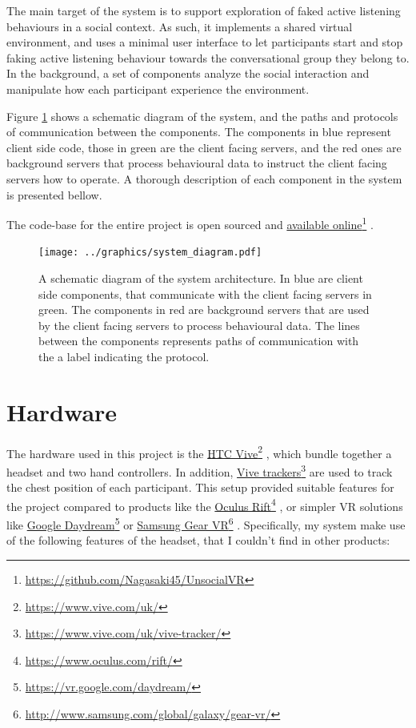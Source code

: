 \documentclass[]{simple-thesis}
\newcommand\fnurl[2]{%
  \href{#2}{#1}\footnote{\url{#2}}%
}
\begin{document}
The main target of the system is to support exploration of faked active listening behaviours in a social context.
As such, it implements a shared virtual environment, and uses a minimal user interface to let participants start and stop faking active listening behaviour towards the conversational group they belong to.
In the background, a set of components analyze the social interaction and manipulate how each participant experience the environment.

Figure \ref{fig:system:diagram} shows a schematic diagram of the system, and the paths and protocols of communication between the components.
The components in blue represent client side code, those in green are the client facing servers, and the red ones are background servers that process behavioural data to instruct the client facing servers how to operate.
A thorough description of each component in the system is presented bellow.

The code-base for the entire project is open sourced and \fnurl{available online}{https://github.com/Nagasaki45/UnsocialVR}.

\begin{figure}
  \texttt{[image: ../graphics/system\_diagram.pdf]}
  \caption{A schematic diagram of the system architecture. In blue are client side components, that communicate with the client facing servers in green. The components in red are background servers that are used by the client facing servers to process behavioural data. The lines between the components represents paths of communication with the a label indicating the protocol.}
  \label{fig:system:diagram}
\end{figure}

\section{Hardware}

The hardware used in this project is the \fnurl{HTC Vive}{https://www.vive.com/uk/}, which bundle together a headset and two hand controllers.
In addition, \fnurl{Vive trackers}{https://www.vive.com/uk/vive-tracker/} are used to track the chest position of each participant.
This setup provided suitable features for the project compared to products like the \fnurl{Oculus Rift}{https://www.oculus.com/rift/}, or simpler VR solutions like \fnurl{Google Daydream}{https://vr.google.com/daydream/} or \fnurl{Samsung Gear VR}{http://www.samsung.com/global/galaxy/gear-vr/}.
Specifically, my system make use of the following features of the headset, that I couldn't find in other products:
\end{document}
